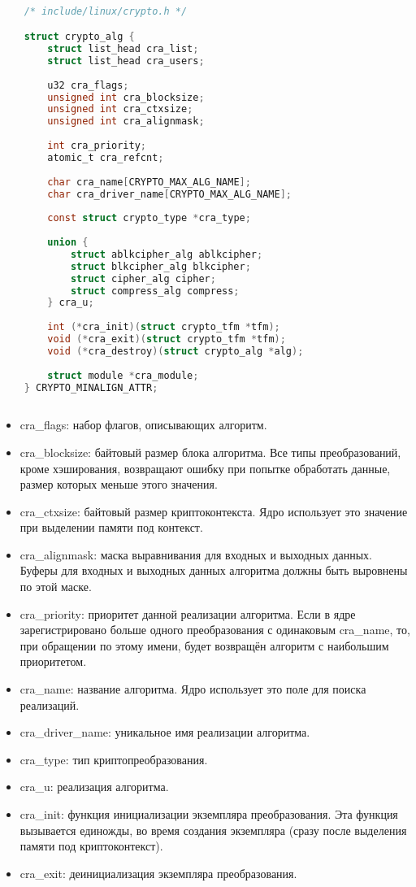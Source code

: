 \begin{lstlisting}[language=c, label=some-code, caption=Структура crypto\_alg]

    /* include/linux/crypto.h */

    struct crypto_alg {
        struct list_head cra_list;
        struct list_head cra_users;
    
        u32 cra_flags;
        unsigned int cra_blocksize;
        unsigned int cra_ctxsize;
        unsigned int cra_alignmask;
    
        int cra_priority;
        atomic_t cra_refcnt;
    
        char cra_name[CRYPTO_MAX_ALG_NAME];
        char cra_driver_name[CRYPTO_MAX_ALG_NAME];
    
        const struct crypto_type *cra_type;
    
        union {
            struct ablkcipher_alg ablkcipher;
            struct blkcipher_alg blkcipher;
            struct cipher_alg cipher;
            struct compress_alg compress;
        } cra_u;
    
        int (*cra_init)(struct crypto_tfm *tfm);
        void (*cra_exit)(struct crypto_tfm *tfm);
        void (*cra_destroy)(struct crypto_alg *alg);
    
        struct module *cra_module;
    } CRYPTO_MINALIGN_ATTR;
    
\end{lstlisting}

\begin{itemize}
    \item cra\_flags: набор флагов, описывающих алгоритм.
    \item cra\_blocksize: байтовый размер блока алгоритма. Все типы преобразований, кроме хэширования, возвращают ошибку при попытке обработать данные, размер которых меньше этого значения.
    \item cra\_ctxsize: байтовый размер криптоконтекста. Ядро использует это значение при выделении памяти под контекст.
    \item cra\_alignmask: маска выравнивания для входных и выходных данных. Буферы для входных и выходных данных алгоритма должны быть выровнены по этой маске.
    \item cra\_priority: приоритет данной реализации алгоритма. Если в ядре зарегистрировано больше одного преобразования с одинаковым cra\_name, то, при обращении по этому имени, будет возвращён алгоритм с наибольшим приоритетом.
    \item cra\_name: название алгоритма. Ядро использует это поле для поиска реализаций.
    \item cra\_driver\_name: уникальное имя реализации алгоритма. 
    \item cra\_type: тип криптопреобразования.
    \item cra\_u: реализация алгоритма.
    \item cra\_init: функция инициализации экземпляра преобразования. Эта функция вызывается единожды, во время создания экземпляра (сразу после выделения памяти под криптоконтекст).
    \item cra\_exit: деинициализация экземпляра преобразования.
\end{itemize}

